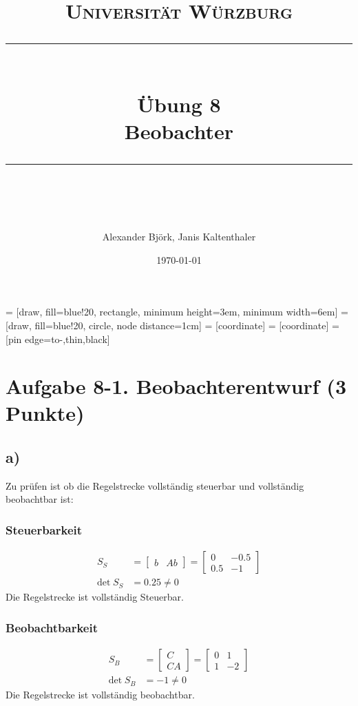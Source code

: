 \documentclass[11pt]{scrartcl} %
\title{	
	\normalfont\normalsize
	\textsc{Universität Würzburg}\\ %
	\vspace{25pt} %
	\rule{\linewidth}{0.5pt}\\ %
	\vspace{20pt} %
	{\huge Übung 8}\\ %
	{\Large Beobachter}\\
	\vspace{12pt} %
	\rule{\linewidth}{2pt}\\ %
	\vspace{12pt} %
}
\author{\LARGE Alexander Björk, Janis Kaltenthaler} %
\date{\normalsize\today} %
\begin{document}
\maketitle %

 = [draw, fill=blue!20, rectangle, 
    minimum height=3em, minimum width=6em]
 = [draw, fill=blue!20, circle, node distance=1cm]
 = [coordinate]
 = [coordinate]
 = [pin edge={to-,thin,black}]
\newcommand{\inte}{$\displaystyle \int$}

\section*{Aufgabe 8-1. Beobachterentwurf (3 Punkte)}
\subsection*{a)}
Zu prüfen ist ob die Regelstrecke vollständig steuerbar und vollständig beobachtbar ist:
\subsubsection*{Steuerbarkeit}
\begin{align*}
	S_S&=\begin{bmatrix}b&Ab \end{bmatrix}=\begin{bmatrix}0&-0.5\\0.5&-1 \end{bmatrix}\\
	\text{det}\hspace{3pt}S_S&=0.25\neq0
\end{align*}
Die Regelstrecke ist vollständig Steuerbar.
\subsubsection*{Beobachtbarkeit}
\begin{align*}
	S_B&=\begin{bmatrix}C\\CA \end{bmatrix}=\begin{bmatrix}0&1\\1&-2 \end{bmatrix}\\
	\text{det}\hspace{3pt}S_B&=-1\neq0
\end{align*}
Die Regelstrecke ist vollständig beobachtbar.
\end{document}
